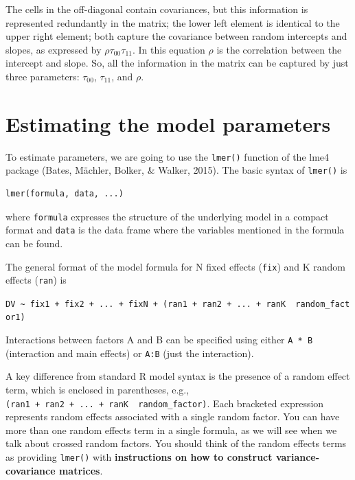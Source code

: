 \documentclass[]{book}
\begin{document}
The cells in the off-diagonal contain covariances, but this information is represented redundantly in the matrix; the lower left element is identical to the upper right element; both capture the covariance between random intercepts and slopes, as expressed by \(\rho\tau_{00}\tau_{11}\). In this equation \(\rho\) is the correlation between the intercept and slope. So, all the information in the matrix can be captured by just three parameters: \(\tau_{00}\), \(\tau_{11}\), and \(\rho\).

\hypertarget{estimating-the-model-parameters}{%
\section{Estimating the model parameters}\label{estimating-the-model-parameters}}

To estimate parameters, we are going to use the \texttt{lmer()} function of the lme4 package (Bates, Mächler, Bolker, \& Walker, 2015). The basic syntax of \texttt{lmer()} is

\begin{verbatim}
lmer(formula, data, ...)
\end{verbatim}

where \texttt{formula} expresses the structure of the underlying model in a compact format and \texttt{data} is the data frame where the variables mentioned in the formula can be found.

The general format of the model formula for N fixed effects (\texttt{fix}) and K random effects (\texttt{ran}) is

\texttt{DV\ \textasciitilde{}\ fix1\ +\ fix2\ +\ ...\ +\ fixN\ +\ (ran1\ +\ ran2\ +\ ...\ +\ ranK\ \textbar{}\ random\_factor1)}

Interactions between factors A and B can be specified using either \texttt{A\ *\ B} (interaction and main effects) or \texttt{A:B} (just the interaction).

A key difference from standard R model syntax is the presence of a random effect term, which is enclosed in parentheses, e.g., \texttt{(ran1\ +\ ran2\ +\ ...\ +\ ranK\ \textbar{}\ random\_factor)}. Each bracketed expression represents random effects associated with a single random factor. You can have more than one random effects term in a single formula, as we will see when we talk about crossed random factors. You should think of the random effects terms as providing \texttt{lmer()} with \textbf{instructions on how to construct variance-covariance matrices}.
\end{document}
